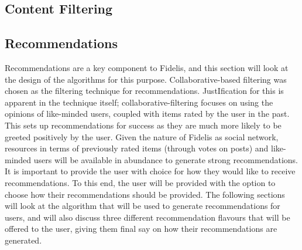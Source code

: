 \subsection{Content Filtering}
\subsection{Recommendations}
Recommendations are a key component to Fidelis, and this section will look at the design of the algorithms for this purpose. Collaborative-based filtering was chosen as the filtering technique for recommendations. JustIfication for this is apparent in the technique itself; collaborative-filtering focuses on using the opinions of like-minded users, coupled with items rated by the user in the past. This sets up recommendations for success as they are much more likely to be greeted positively by the user. Given the nature of Fidelis as social network, resources in terms of previously rated items (through votes on posts) and like-minded users will be available in abundance to generate strong recommendations. It is important to provide the user with choice for how they would like to receive recommendations. To this end, the user will be provided with the option to choose how their recommendations should be provided. The following sections will look at the algorithm that will be used to generate recommendations for users, and will also discuss three different recommendation flavours that will be offered to the user, giving them final say on how their recommendations are generated. 

